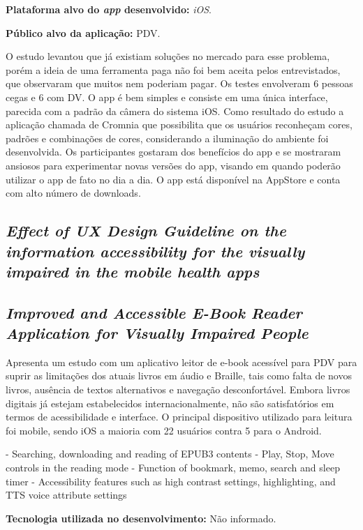 \textbf{Plataforma alvo do \emph{app} desenvolvido:} \emph{iOS}.

\textbf{Público alvo da aplicação:} PDV\@.

O estudo levantou que já existiam soluções no mercado para esse problema, porém a ideia de uma ferramenta paga não foi bem aceita pelos entrevistados, que observaram que muitos nem poderiam pagar.
Os testes envolveram 6 pessoas cegas e 6 com DV.
O app é bem simples e consiste em uma única interface, parecida com a padrão da câmera do sistema iOS.
Como resultado do estudo a aplicação chamada de Cromnia que possibilita que os usuários reconheçam cores, padrões e combinações de cores, considerando a iluminação do ambiente foi desenvolvida.
Os participantes gostaram dos benefícios do app e se mostraram ansiosos para experimentar novas versões do app, visando em quando poderão utilizar o app de fato no dia a dia.
O app está disponível na AppStore e conta com alto número de downloads.

\subsection{\emph{Effect of UX Design Guideline on the information accessibility for the visually impaired in the mobile health apps}}

\lipsum[31]

\subsection{\emph{Improved and Accessible E-Book Reader Application for Visually Impaired People}}

Apresenta um estudo com um aplicativo leitor de e-book acessível para PDV para suprir as limitações dos atuais livros em áudio e Braille, tais como falta de novos livros, ausência de textos alternativos e navegação desconfortável.
Embora livros digitais já estejam estabelecidos internacionalmente, não são satisfatórios em termos de acessibilidade e interface.
O principal dispositivo utilizado para leitura foi mobile, sendo iOS a maioria com 22 usuários contra 5 para o Android.

- Searching, downloading and reading of EPUB3 contents
- Play, Stop, Move controls in the reading mode
- Function of bookmark, memo, search and sleep timer
- Accessibility features such as high contrast settings, highlighting, and TTS voice attribute settings

\textbf{Tecnologia utilizada no desenvolvimento:} Não informado.

